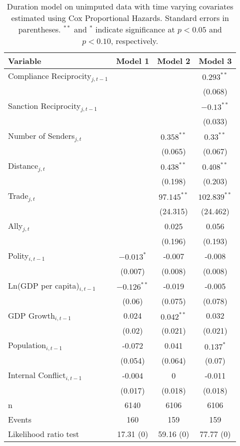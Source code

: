 \begin{table}[ht]
\centering
{\normalsize
\begin{tabular}{lccc}
 Variable & Model 1 & Model 2 & Model 3 \\ 
  \hline
\hline
Compliance Reciprocity$_{j,t-1}$ &  &  & $0.293^{\ast\ast}$ \\ 
   &  &  & (0.068) \\ 
  Sanction Reciprocity$_{j,t-1}$ &  &  & $-0.13^{\ast\ast}$ \\ 
   &  &  & (0.033) \\ 
   \hline
Number of Senders$_{j,t}$ &  & $0.358^{\ast\ast}$ & $0.33^{\ast\ast}$ \\ 
   &  & (0.065) & (0.067) \\ 
  Distance$_{j,t}$ &  & $0.438^{\ast\ast}$ & $0.408^{\ast\ast}$ \\ 
   &  & (0.198) & (0.203) \\ 
  Trade$_{j,t}$ &  & $97.145^{\ast\ast}$ & $102.839^{\ast\ast}$ \\ 
   &  & (24.315) & (24.462) \\ 
  Ally$_{j,t}$ &  & 0.025 & 0.056 \\ 
   &  & (0.196) & (0.193) \\ 
   \hline
Polity$_{i,t-1}$ & $-0.013^{\ast}$ & -0.007 & -0.008 \\ 
   & (0.007) & (0.008) & (0.008) \\ 
  Ln(GDP per capita)$_{i,t-1}$ & $-0.126^{\ast\ast}$ & -0.019 & -0.005 \\ 
   & (0.06) & (0.075) & (0.078) \\ 
  GDP Growth$_{i,t-1}$ & 0.024 & $0.042^{\ast\ast}$ & 0.032 \\ 
   & (0.02) & (0.021) & (0.021) \\ 
  Population$_{i,t-1}$ & -0.072 & 0.041 & $0.137^{\ast}$ \\ 
   & (0.054) & (0.064) & (0.07) \\ 
  Internal Conflict$_{i,t-1}$ & -0.004 & 0 & -0.011 \\ 
   & (0.017) & (0.018) & (0.018) \\ 
   \hline
n & 6140 & 6106 & 6106 \\ 
  Events & 160 & 159 & 159 \\ 
  Likelihood ratio test & 17.31 (0) & 59.16 (0) & 77.77 (0) \\ 
   \hline
\hline
\end{tabular}
}
\caption{Duration model on unimputed data with time varying covariates estimated using Cox Proportional Hazards. Standard errors in parentheses. $^{**}$ and $^{*}$ indicate significance at $p< 0.05 $ and $p< 0.10 $, respectively.} 
\label{tab:regResultsNoImp}
\end{table}
